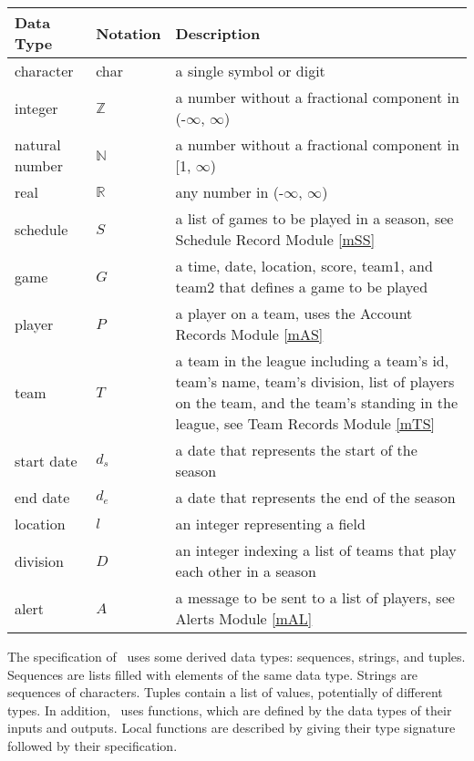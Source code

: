\documentclass[12pt, titlepage]{article}
\begin{document}
\begin{center}
\renewcommand{\arraystretch}{1.2}
\noindent 
\begin{tabular}{l l p{7.5cm}} 
\toprule 
\textbf{Data Type} & \textbf{Notation} & \textbf{Description}\\ 
\midrule
character & char & a single symbol or digit\\
integer & $\mathbb{Z}$ & a number without a fractional component in (-$\infty$, $\infty$) \\
natural number & $\mathbb{N}$ & a number without a fractional component in [1, $\infty$) \\
real & $\mathbb{R}$ & any number in (-$\infty$, $\infty$)\\
schedule & $S$ & a list of games to be played in a season, see Schedule
Record Module \ref{mSS}\\
game & $G$ & a time, date, location, score, team1, and team2 that defines a game to
be played\\
player & $P$ & a player on a team, uses the Account Records Module
\ref{mAS}\\
team & $T$ & a team in the league including a team's id, team's name, team's division,
list of players on the team, and the team's standing in the league,
see Team Records Module \ref{mTS}\\
start date & $d_s$ & a date that represents the start of the season\\
end date & $d_e$ & a date that represents the end of the season\\
location & $l$ & an integer representing a field\\
division & $D$ & an integer indexing a list of teams that play each other in a
season\\
alert & $A$ & a message to be sent to a list of players, see Alerts Module
\ref{mAL}\\

\bottomrule
\end{tabular} 
\end{center}

\noindent
The specification of \progname \ uses some derived data types: sequences, strings, and
tuples. Sequences are lists filled with elements of the same data type. Strings
are sequences of characters. Tuples contain a list of values, potentially of
different types. In addition, \progname \ uses functions, which
are defined by the data types of their inputs and outputs. Local functions are
described by giving their type signature followed by their specification.
\end{document}
